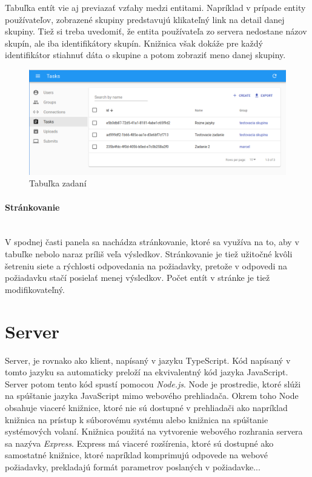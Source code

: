 Tabuľka entít vie aj previazať vzťahy medzi entitami. Napríklad v prípade entity používateľov, 
zobrazené skupiny predstavujú klikateľný link na detail danej skupiny. Tiež si treba uvedomiť, že
entita používateľa zo servera nedostane názov skupín, ale iba identifikátory skupín. Knižnica 
však dokáže pre každý identifikátor stiahnuť dáta o skupine a potom zobraziť meno danej skupiny.
\begin{figure}[H]
\centerline{\includegraphics[width=1\textwidth]{images/zadania}}
\caption[Tabuľka zadaní]{Tabuľka zadaní}
\label{obr:zadania}
\end{figure}

\paragraph{Stránkovanie}\leavevmode\\
V spodnej časti panela sa nachádza stránkovanie, ktoré sa využíva na to, aby v tabuľke nebolo naraz
príliš veľa výsledkov. Stránkovanie je tiež užitočné kvôli šetreniu siete a rýchlosti odpovedania na
požiadavky, pretože v odpovedi na požiadavku stačí posielať menej výsledkov. Počet entít v stránke
je tiež modifikovateľný.

\section{Server}
Server, je rovnako ako klient, napísaný v jazyku TypeScript. Kód napísaný v tomto jazyku sa
automaticky preloží na ekvivalentný kód jazyka JavaScript. Server potom tento kód spustí pomocou
\textit{Node.js}. Node je prostredie, ktoré slúži na spúštanie jazyka JavaScript mimo webového
prehliadača. Okrem toho Node obsahuje viaceré knižnice, ktoré nie sú dostupné v prehliadači ako
napríklad knižnica na prístup k súborovému systému alebo knižnica na spúštanie systémových volaní.
Knižnica použitá na vytvorenie webového rozhrania servera sa nazýva \textit{Express}. Express má
viaceré rozšírenia, ktoré sú dostupné ako samostatné knižnice, ktoré napríklad komprimujú odpovede
na webové požiadavky, prekladajú formát parametrov poslaných v požiadavke...

